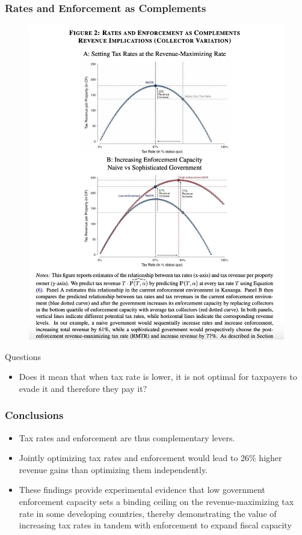 \documentclass{beamer}
\begin{document}
\begin{frame}
\frametitle{Rates and Enforcement as Complements}
\begin{figure}
    \centering
    \includegraphics[height=0.9\textheight,width=\textwidth]{Paper Presentations/The State Capacity Ceiling on Tax Rates/F2.png}
\end{figure}
\end{frame}

\begin{frame}{Questions}
    \begin{itemize}
        \item Does it mean that when tax rate is lower, it is not optimal for taxpayers to evade it and therefore they pay it?
    \end{itemize}
\end{frame}
\begin{frame}
\frametitle{Conclusions}
\begin{itemize}
\item Tax rates and enforcement are thus complementary levers. 
\item Jointly optimizing tax rates and
enforcement would lead to 26\% higher revenue gains than optimizing them independently.
\item These
findings provide experimental evidence that low government enforcement capacity sets a binding
ceiling on the revenue-maximizing tax rate in some developing countries, thereby demonstrating
the value of increasing tax rates in tandem with enforcement to expand fiscal capacity
\end{itemize}
\end{frame}
\end{document}
